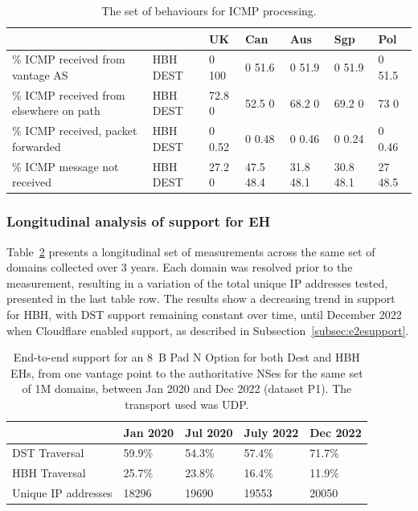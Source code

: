 \documentclass[conference]{IEEEtran}
\begin{document}
\begin{table}
\begin{tabular}{p{}|p{}|p{}|p{}|p{}|p{}|p{}}

\centering

                                           &             & UK        & Can       & Aus    & Sgp          & Pol     \\
                                           \hline

{\% ICMP received from vantage AS}        & {HBH DEST} & {0 100}  & {0 51.6}    & {0 51.9}    & {0 51.9}    & {0 51.5}  \\
\hline
{\% ICMP received from elsewhere on path}          & {HBH DEST} & {72.8 0} & {52.5 0}    & {68.2 0}    & {69.2 0}    & {73  0}    \\
\hline

{\% ICMP received, packet forwarded}          & {HBH DEST} & {0 0.52} & {0 0.48}    & {0 0.46}    & {0 0.24}    & {0 0.46}  \\
\hline

{\% ICMP message not received} & {HBH DEST} & {27.2 0} & {47.5 48.4} & {31.8 48.1} & {30.8 48.1} & {27 48.5} 
\end{tabular}
\caption{The set of behaviours for ICMP processing.}
\label{tbl:icmp_support_dst}
\end{table}


\subsubsection{Longitudinal analysis of support for EH}

Table~\ref{tbl:longitudinal_support} presents a longitudinal set of measurements across the same set of domains collected over 3 years. Each domain was resolved prior to the measurement, resulting in a variation of the total unique IP addresses tested, presented in the last table row. The results show a decreasing trend in  support for HBH, with DST support remaining constant over time, until December 2022 when Cloudflare enabled support, as described in Subsection~\ref{subsec:e2esupport}.

\begin{table}
\begin{tabular}{l|l|l|l|l}
                    & Jan 2020 & Jul 2020 & July 2022 & Dec 2022 \\
\hline
DST Traversal& 59.9\%   & 54.3\%   & 57.4\%    & 71.7\%   \\
HBH Traversal & 25.7\%   & 23.8\%   & 16.4\%    & 11.9\%   \\
\hline
Unique IP addresses & 18296    & 19690    & 19553     & 20050   
\end{tabular}
\label{tbl:longitudinal_support}
\caption{End-to-end support for an 8~B Pad N Option for both Dest and HBH EHs, from one vantage point to the authoritative NSes for the same set of 1M domains, between Jan 2020 and Dec 2022 (dataset P1). The transport used was UDP.}
\end{table}
\end{document}
